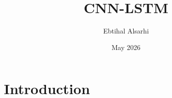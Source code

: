 \documentclass{article}
\title{CNN-LSTM}
\author{Ebtihal Alsarhi}
\date{May 2026}
\begin{document}
\maketitle


\newpage
\section{Introduction}
\end{document}
